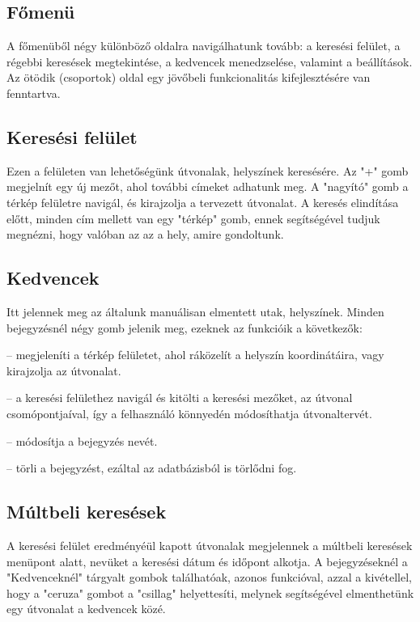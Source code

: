 \subsection{Főmenü}

A főmenüből négy különböző oldalra navigálhatunk tovább: a keresési felület, a régebbi keresések megtekintése, a kedvencek menedzselése, valamint a beállítások. Az ötödik (csoportok) oldal egy jövőbeli funkcionalitás kifejlesztésére van fenntartva.

\subsection{Keresési felület}

Ezen a felületen van lehetőségünk útvonalak, helyszínek keresésére. Az "+" gomb megjelnít egy új mezőt, ahol további címeket adhatunk meg. A "nagyító" gomb a térkép felületre navigál, és kirajzolja a tervezett útvonalat. A keresés elindítása előtt, minden cím mellett van egy "térkép" gomb, ennek segítségével tudjuk megnézni, hogy valóban az az a hely, amire gondoltunk.

\subsection{Kedvencek}
 
 Itt jelennek meg az általunk manuálisan elmentett utak, helyszínek. Minden bejegyzésnél négy gomb jelenik meg, ezeknek az funkcióik a következők:
 
 \begin{description}
 	\setlength{\itemsep}{0.04mm}
 	\item[térkép] -- megjeleníti a térkép felületet, ahol ráközelít a helyszín koordinátáira, vagy kirajzolja az útvonalat.
 	\item[nagyító] -- a keresési felülethez navigál és kitölti a keresési mezőket, az útvonal csomópontjaíval, így a felhasználó könnyedén módosíthatja útvonaltervét.
 	\item[ceruza] -- módosítja a bejegyzés nevét.
 	\item[szemetes veder] -- törli a bejegyzést, ezáltal az adatbázisból is törlődni fog.
 \end{description}

\subsection{Múltbeli keresések}

A keresési felület eredményéül kapott útvonalak megjelennek a múltbeli keresések menüpont alatt, nevüket a keresési dátum és időpont alkotja. A bejegyzéseknél a "Kedvenceknél" tárgyalt gombok találhatóak, azonos funkcióval, azzal a kivétellel, hogy a "ceruza" gombot a "csillag" helyettesíti, melynek segítségével elmenthetünk egy útvonalat a kedvencek közé.

